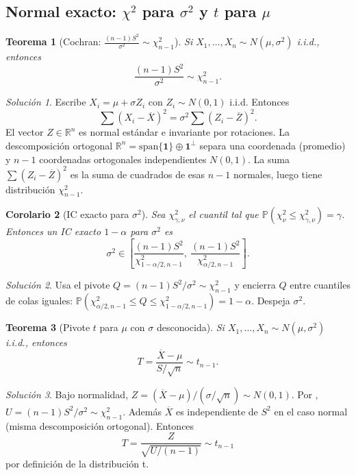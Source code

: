 \documentclass[11pt]{article}
\theoremstyle{plain}
\newtheorem{theorem}{Teorema}[section]
\newtheorem{corollary}[theorem]{Corolario}
\theoremstyle{definition}
\theoremstyle{remark}
\theoremstyle{solstyle}
\newtheorem*{solution}{Solución}
\newcommand{\Pbb}{\mathbb{P}}
\newcommand{\R}{\mathbb{R}}
\newcommand{\1}{\mathbbm{1}}
\newcommand{\Xbar}{\overline{X}}
\begin{document}
\subsection{Normal exacto: $\chi^2$ para $\sigma^2$ y $t$ para $\mu$}

\begin{theorem}[Cochran: $\frac{(n-1)S^2}{\sigma^2}\sim\chi^2_{n-1}$]\label{thm:cochran}
Si $X_1,\dots,X_n\sim N(\mu,\sigma^2)$ i.i.d., entonces
\[
\frac{(n-1)S^2}{\sigma^2}\sim \chi^2_{n-1}.
\]
\end{theorem}

\begin{solution}
Escribe $X_i=\mu+\sigma Z_i$ con $Z_i\sim N(0,1)$ i.i.d. Entonces
\[
\sum (X_i-\Xbar)^2=\sigma^2\sum (Z_i-\overline Z)^2.
\]
El vector $Z\in\R^n$ es normal estándar e invariante por rotaciones.
La descomposición ortogonal $\R^n=\mathrm{span}\{\mathbf 1\}\oplus \mathbf 1^\perp$
separa una coordenada (promedio) y $n-1$ coordenadas ortogonales independientes $N(0,1)$.
La suma $\sum(Z_i-\overline Z)^2$ es la suma de cuadrados de esas $n-1$ normales,
luego tiene distribución $\chi^2_{n-1}$.
\end{solution}

\begin{corollary}[IC exacto para $\sigma^2$]\label{cor:CIvar}
Sea $\chi^2_{\gamma,\nu}$ el cuantil tal que $\Pbb(\chi^2_\nu\le \chi^2_{\gamma,\nu})=\gamma$.
Entonces un IC exacto $1-\alpha$ para $\sigma^2$ es
\[
\sigma^2\in
\left[
\frac{(n-1)S^2}{\chi^2_{1-\alpha/2,n-1}},
\ \frac{(n-1)S^2}{\chi^2_{\alpha/2,n-1}}
\right].
\]
\end{corollary}

\begin{solution}
Usa el pivote $Q=(n-1)S^2/\sigma^2\sim\chi^2_{n-1}$ y encierra $Q$ entre cuantiles de colas iguales:
$\Pbb(\chi^2_{\alpha/2,n-1}\le Q\le \chi^2_{1-\alpha/2,n-1})=1-\alpha$. Despeja $\sigma^2$.
\end{solution}

\begin{theorem}[Pivote $t$ para $\mu$ con $\sigma$ desconocida]\label{thm:tPivot}
Si $X_1,\dots,X_n\sim N(\mu,\sigma^2)$ i.i.d., entonces
\[
T=\frac{\Xbar-\mu}{S/\sqrt n}\sim t_{n-1}.
\]
\end{theorem}

\begin{solution}
Bajo normalidad,
$Z=(\Xbar-\mu)/(\sigma/\sqrt n)\sim N(0,1)$.
Por , $U=(n-1)S^2/\sigma^2\sim\chi^2_{n-1}$.
Además $\Xbar$ es independiente de $S^2$ en el caso normal (misma descomposición ortogonal).
Entonces
\[
T=\frac{Z}{\sqrt{U/(n-1)}}\sim t_{n-1}
\]
por definición de la distribución t.
\end{solution}
\end{document}
